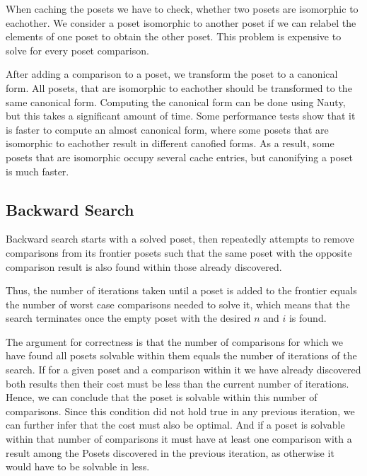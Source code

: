 \documentclass[10pt,journal,compsoc]{IEEEtran}
\begin{document}
When caching the posets we have to check, whether two posets are isomorphic to eachother.
We consider a poset isomorphic to another poset if we can relabel the elements of one poset to obtain the other poset.
This problem is expensive to solve for every poset comparison.

After adding a comparison to a poset, we transform the poset to a canonical form.
All posets, that are isomorphic to eachother should be transformed to the same canonical form.
Computing the canonical form can be done using Nauty, but this takes a significant amount of time.
Some performance tests show that it is faster to compute an almost canonical form, where some posets that are isomorphic to eachother result in different canofied forms.
As a result, some posets that are isomorphic occupy several cache entries, but canonifying a poset is much faster.

\subsection{Backward Search} \label{sec:backward}

Backward search starts with a solved poset, then repeatedly attempts to remove comparisons from its
frontier posets such that the same poset with the opposite comparison result is also found within
those already discovered.

Thus, the number of iterations taken until a poset is added to the frontier equals the number of
worst case comparisons needed to solve it, which means that the search terminates once the empty
poset with the desired $n$ and $i$ is found.

The argument for correctness is that the number of comparisons for which we have found all posets solvable within them equals the number of iterations of the search.
If for a given poset and a comparison within it we have already discovered both results then their cost must be less than the current number of iterations. Hence, we can conclude that the poset is solvable within this number of comparisons.
Since this condition did not hold true in any previous iteration, we can further infer that the cost must also be optimal.
And if a poset is solvable within
that number of comparisons it must have at least one comparison with a result among the Posets
discovered in the previous iteration, as otherwise it would have to be solvable in less.

\end{document}
